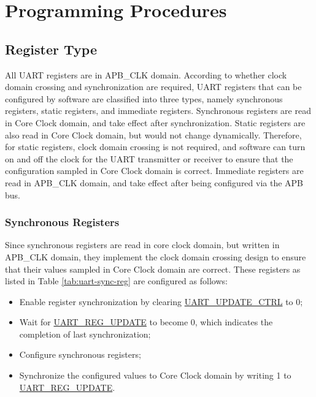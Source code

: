 \documentclass[main\_\_EN.tex]{subfiles}
\begin{document}
\section{Programming Procedures}\label{sec:uart-program}

\subsection{Register Type}

All UART registers are in APB\_CLK domain. According to whether clock domain crossing and synchronization are required, UART registers that can be configured by software are classified into three types, namely synchronous registers, static registers, and immediate registers. Synchronous registers are read in Core Clock domain, and take effect after synchronization. Static registers are also read in Core Clock domain, but would not change dynamically. Therefore, for static registers, clock domain crossing is not required, and software can turn on and off the clock for the UART transmitter or receiver to ensure that the configuration sampled in Core Clock domain is correct. Immediate registers are read in APB\_CLK domain, and take effect after being configured via the APB bus.

\subsubsection{Synchronous Registers}

Since synchronous registers are read in core clock domain, but written in APB\_CLK domain, they implement the clock domain crossing design to ensure that their values sampled in Core Clock domain are correct. These registers as listed in Table \ref{tab:uart-sync-reg} are configured as follows:

\begin{itemize}
    \item Enable register synchronization by clearing \hyperref[fielddesc:UARTUPDATECTRL]{UART\_UPDATE\_CTRL} to 0;
    \item Wait for \hyperref[fielddesc:UARTREGUPDATE]{UART\_REG\_UPDATE} to become 0, which indicates the completion of last synchronization;
    \item Configure synchronous registers;
    \item Synchronize the configured values to Core Clock domain by writing 1 to \hyperref[fielddesc:UARTREGUPDATE]{UART\_REG\_UPDATE}.
\end{itemize}
\end{document}
